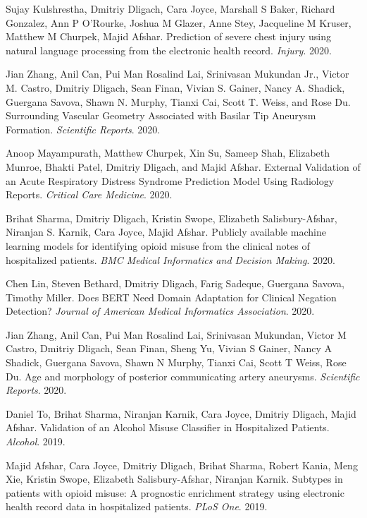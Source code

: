 \documentclass[letterpaper]{article}
\renewenvironment{itemize}{
  \begin{list}{}{
    \setlength{\leftmargin}{1.5em}
  }
}{
  \end{list}
}
\begin{document}
\begin{itemize}
\item Sujay Kulshrestha, Dmitriy Dligach, Cara Joyce, Marshall S Baker, Richard Gonzalez, Ann P O'Rourke, Joshua M Glazer, Anne Stey, Jacqueline M Kruser, Matthew M Churpek, Majid Afshar. Prediction of severe chest injury using natural language processing from the electronic health record. \emph{Injury}. 2020.
\item Jian Zhang, Anil Can, Pui Man Rosalind Lai, Srinivasan Mukundan Jr., Victor M. Castro, Dmitriy Dligach, Sean Finan, Vivian S. Gainer, Nancy A. Shadick, Guergana Savova, Shawn N. Murphy, Tianxi Cai, Scott T. Weiss, and Rose Du. Surrounding Vascular Geometry Associated with Basilar Tip Aneurysm Formation. \emph{Scientific Reports}. 2020.
\item Anoop Mayampurath, Matthew Churpek, Xin Su, Sameep Shah, Elizabeth Munroe, Bhakti Patel, Dmitriy Dligach, and Majid Afshar. External Validation of an Acute Respiratory Distress Syndrome Prediction Model Using Radiology Reports. \emph{Critical Care Medicine}. 2020.
\item Brihat Sharma, Dmitriy Dligach, Kristin Swope, Elizabeth Salisbury-Afshar, Niranjan S. Karnik, Cara Joyce, Majid Afshar. Publicly available machine learning models for identifying opioid misuse from the clinical notes of hospitalized patients. \emph{BMC Medical Informatics and Decision Making}. 2020.
\item Chen Lin, Steven Bethard, Dmitriy Dligach, Farig Sadeque, Guergana Savova, Timothy Miller. Does BERT Need Domain Adaptation for Clinical Negation Detection? \emph{Journal of American Medical Informatics Association}. 2020.
\item Jian Zhang, Anil Can, Pui Man Rosalind Lai, Srinivasan Mukundan, Victor M Castro, Dmitriy Dligach, Sean Finan, Sheng Yu, Vivian S Gainer, Nancy A Shadick, Guergana Savova, Shawn N Murphy, Tianxi Cai, Scott T Weiss, Rose Du. Age and morphology of posterior communicating artery aneurysms. \emph{Scientific Reports}. 2020.
\item Daniel To, Brihat Sharma, Niranjan Karnik, Cara Joyce, Dmitriy Dligach, Majid Afshar. Validation of an Alcohol Misuse Classifier in Hospitalized Patients. \emph{Alcohol}. 2019.
\item Majid Afshar, Cara Joyce, Dmitriy Dligach, Brihat Sharma, Robert Kania, Meng Xie, Kristin Swope, Elizabeth Salisbury-Afshar, Niranjan Karnik. Subtypes in patients with opioid misuse: A prognostic enrichment strategy using electronic health record data in hospitalized patients. \emph{PLoS One}. 2019.

\end{itemize}
\end{document}

